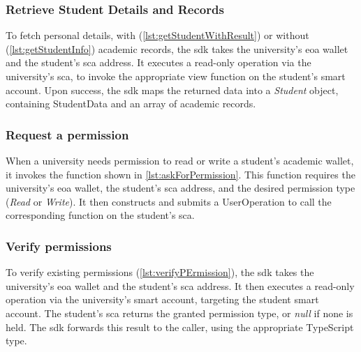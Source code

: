 

\subsubsection{Retrieve Student Details and Records}
To fetch personal details, with (\cref{lst:getStudentWithResult}) or without (\cref{lst:getStudentInfo}) academic records, the \gls{sdk} takes the university's \gls{eoa} wallet and the student's \gls{sca} address. It executes a read-only operation via the university's \gls{sca}, to invoke the appropriate view function on the student's smart account. Upon success, the \gls{sdk} maps the returned data into a \textit{Student} object, containing StudentData and an array of academic records.





\subsubsection{Request a permission}
When a university needs permission to read or write a student’s academic wallet, it invokes the function shown in \cref{lst:askForPermission}. This function requires the university’s \gls{eoa} wallet, the student’s \gls{sca} address, and the desired permission type (\textit{Read} or \textit{Write}). It then constructs and submits a UserOperation to call the corresponding function on the student’s \gls{sca}.



\subsubsection{Verify permissions}
To verify existing permissions (\cref{lst:verifyPErmission}), the \gls{sdk} takes the university's \gls{eoa} wallet and the student's \gls{sca} address. It then executes a read-only operation via the university's smart account, targeting the student smart account. The student's \gls{sca} returns the granted permission type, or \textit{null} if none is held. The \gls{sdk} forwards this result to the caller, using the appropriate TypeScript type.

